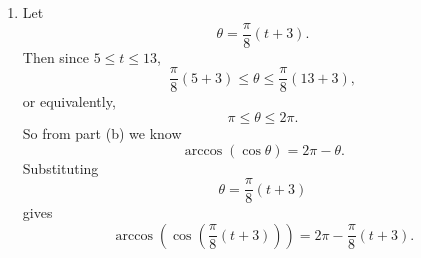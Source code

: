 \documentclass{ximera}
\begin{document}
\begin{question}
\begin{explanation}
\begin{enumerate}
To express $\phi =  \arccos(\cos\theta)$ in terms of $\theta$, imagine standing at the origin facing in the direction of the positive $x$-axis. To end up facing the point $Q$, we could first rotate counterclockwise through the angle $2\pi$ and then clockwise through the angle $\theta$. This means that
\[
  \arccos(\cos\theta) = 2\pi - \theta
\]
if $\pi \leq \theta \leq 2\pi$.

\item Let 
\[
 \theta= \frac{\pi}{8}\left( t+3 \right).
\]
Then since $5\leq t \leq 13$,
\[
       \frac{\pi}{8}\left(5+3 \right) \leq \theta \leq \frac{\pi}{8}\left( 13+3 \right),
\]
or equivalently,
\[
       \pi \leq \theta \leq 2\pi.
\]
So from part (b) we know
\[
 \arccos(\cos\theta) = 2\pi - \theta .
\]
Substituting 
\[
   \theta = \frac{\pi}{8}\left( t+3 \right)
\]
gives
\[
  \arccos\left(\cos\left( \frac{\pi}{8}\left( t+3 \right) \right)\right) = 2\pi - \frac{\pi}{8}\left( t+3 \right).
\]
\end{enumerate}
\end{explanation}

\end{question}
\end{document}

